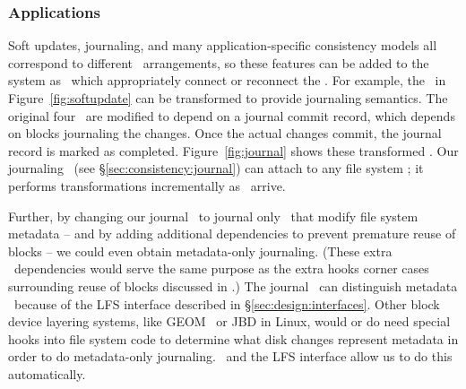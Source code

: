 \subsubsection {Applications}
Soft updates, journaling, and many application-specific consistency
models all correspond to different \chdesc\ arrangements, so these
features can be added to the system as \modules\ which appropriately
connect or reconnect the \chdescs.  For example, the \chdescs\ in
Figure~\ref{fig:softupdate} can be transformed to provide journaling
semantics. The original four \chdescs\ are modified to depend on a
journal commit record, which depends on blocks journaling the
changes. Once the actual changes commit, the journal record is marked
as completed.  Figure~\ref{fig:journal} shows these transformed
\chdescs. Our journaling \module\ (see
\S\ref{sec:consistency:journal}) can attach to any file system
\module; it performs transformations incrementally as \chdescs\
arrive.

Further, by changing our journal \module\ to journal only \chdescs\
that modify file system metadata -- and by adding additional
dependencies to prevent premature reuse of blocks -- we could even
obtain metadata-only journaling.  (These extra \chdesc\ dependencies
would serve the same purpose as the extra hooks corner cases
surrounding reuse of blocks discussed in \cite{tweedie00ext3}.) The
journal \module\ can distinguish metadata \chdescs\ because of the LFS
interface described in \S\ref{sec:design:interfaces}. Other block
device layering systems, like GEOM~\cite{geom} or JBD in Linux, would
or do need special hooks into file system code to determine what disk
changes represent metadata in order to do metadata-only
journaling. \Chdescs\ and the LFS interface allow us to do this
automatically.
